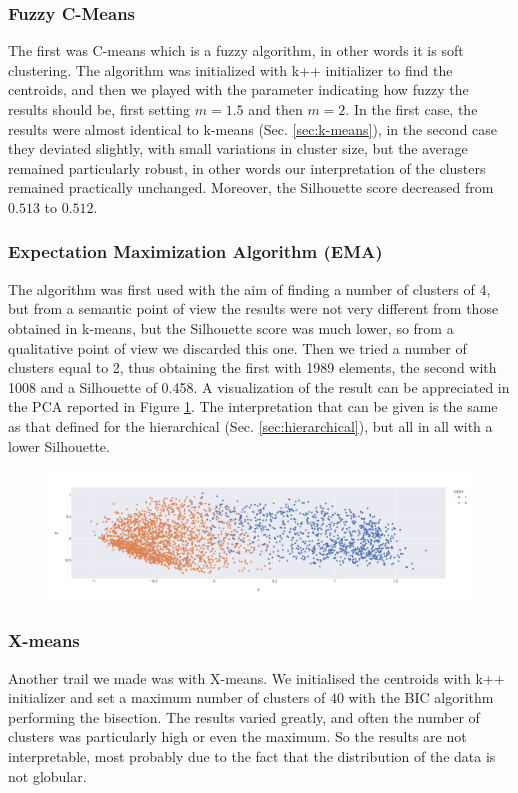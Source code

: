 \subsubsection{Fuzzy C-Means}
The first was C-means which is a fuzzy algorithm, in other words it is soft clustering. The algorithm was initialized with k++ initializer to find the centroids, and then we played with the parameter indicating how fuzzy the results should be, first setting $m=1.5$ and then $m=2$. In the first case, the results were almost identical to k-means (Sec. \ref{sec:k-means}), in the second case they deviated slightly, with small variations in cluster size, but the average remained particularly robust, in other words our interpretation of the clusters remained practically unchanged. Moreover, the Silhouette score decreased from $0.513$ to $0.512$.

\subsubsection{Expectation Maximization Algorithm (EMA)}
The algorithm was first used with the aim of finding a number of clusters of 4, but from a semantic point of view the results were not very different from those obtained in k-means, but the Silhouette score was much lower, so from a qualitative point of view we discarded this one. Then we tried a number of clusters equal to 2, thus obtaining the first with 1989 elements, the second with 1008 and a Silhouette of 0.458. A visualization of the result can be appreciated in the PCA reported in Figure \ref{fig:ema_pca}. The interpretation that can be given is the same as that defined for the hierarchical (Sec. \ref{sec:hierarchical}), but all in all with a lower Silhouette.
\begin{figure}[h]
	\centering
	\includegraphics[width=\textwidth]{plots/ema/ema_pca.png}
	\label{fig:ema_pca}
\end{figure}

\subsubsection{X-means}
Another trail we made was with X-means. We initialised the centroids with k++ initializer and set a maximum number of clusters of $40$ with the BIC algorithm performing the bisection. The results varied greatly, and often the number of clusters was particularly high or even the maximum. So the results are not interpretable, most probably due to the fact that the distribution of the data is not globular.